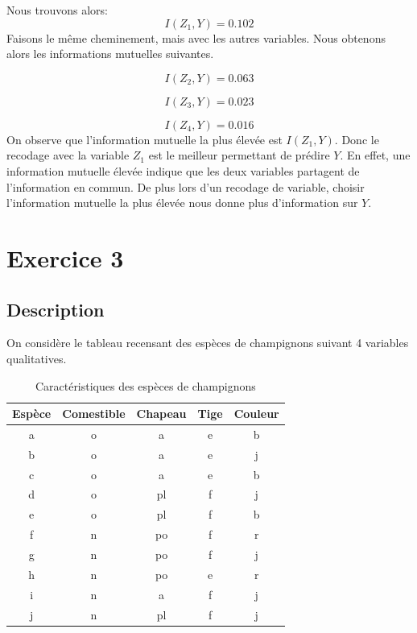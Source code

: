 \documentclass{article}
\begin{document}
Nous trouvons alors:
\[
  I(Z_1, Y)= 0.102
\]
Faisons le même cheminement, mais avec les autres variables. Nous obtenons alors les informations mutuelles suivantes.

\[
I(Z_2,Y) = 0.063
\]

\[
I(Z_3,Y) = 0.023
\]

\[
I(Z_4,Y) = 0.016
\]
On observe que l'information mutuelle la plus élevée est $I(Z_1,Y)$. Donc le recodage avec la variable $Z_1$ est le meilleur permettant de prédire $Y$. En effet, une information mutuelle élevée indique que les deux variables partagent de l'information en commun. De plus lors d'un recodage de variable, choisir l'information mutuelle la plus élevée nous donne plus d'information sur $Y$.


\newpage
\section{Exercice 3}
\label{exercice3}
\subsection{Description}

On considère le tableau recensant des espèces de champignons suivant 4 variables qualitatives. 

\begin{table}[h]
  \centering
  \caption{Caractéristiques des espèces de champignons}
  \begin{tabular}{@{}ccccc@{}}
  \toprule
  Espèce & Comestible & Chapeau & Tige & Couleur \\ \midrule
  a      & o          & a       & e    & b       \\
  b      & o          & a       & e    & j       \\
  c      & o          & a       & e    & b       \\
  d      & o          & pl      & f    & j       \\
  e      & o          & pl      & f    & b       \\
  f      & n          & po      & f    & r       \\
  g      & n          & po      & f    & j       \\
  h      & n          & po      & e    & r       \\
  i      & n          & a       & f    & j       \\
  j      & n          & pl      & f    & j       \\ \bottomrule
  \end{tabular}
  
  \label{tab:champignons}
  \end{table}
\end{document}
